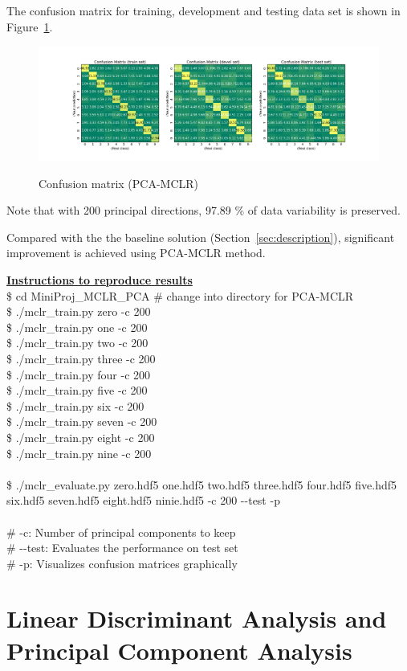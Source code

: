 \documentclass[a4paper,10pt,fleqn]{article}
\newcommand{\note}[1]{
\begin{boxitpara}{}%
\textbf{\underline{Instructions to reproduce results}} #1
\end{boxitpara}}
\begin{document}
The confusion matrix for training, development and testing data set is shown in Figure~\ref{fig:pca_mclr}.
\begin{figure}[htbf]
  \caption{Confusion matrix (PCA-MCLR)}
  \centering \includegraphics[width=\textwidth,height=0.3\textwidth]{Figures/mclr_pca200}
  \label{fig:pca_mclr}
\end{figure}

Note that with 200 principal directions,  97.89 \% of data variability is preserved.

Compared with the the baseline solution (Section~\ref{sec:description}), significant improvement is achieved using PCA-MCLR method.

\note{\\ \$ cd  {MiniProj\_MCLR\_PCA} \# change into directory for PCA-MCLR \\
\$ ./mclr\_train.py zero -c 200 \\
\$ ./mclr\_train.py one -c 200 \\
\$ ./mclr\_train.py two -c 200 \\
\$ ./mclr\_train.py three -c 200 \\
\$ ./mclr\_train.py four -c 200 \\
\$ ./mclr\_train.py five -c 200 \\
\$ ./mclr\_train.py six -c 200 \\
\$ ./mclr\_train.py seven -c 200 \\
\$ ./mclr\_train.py eight -c 200 \\
\$ ./mclr\_train.py nine -c 200 \\\\
\$ ./mclr\_evaluate.py zero.hdf5 one.hdf5 two.hdf5 three.hdf5 four.hdf5 five.hdf5 six.hdf5 seven.hdf5 eight.hdf5 ninie.hdf5 -c 200 -{}-test -p\\\\
\# -c: Number of principal components to keep\\
\# -{}-test: Evaluates the performance on test set\\
\# -p: Visualizes confusion matrices graphically
}

\section{Linear Discriminant Analysis and Principal Component Analysis}\label{sec:pca_lda}
\end{document}
